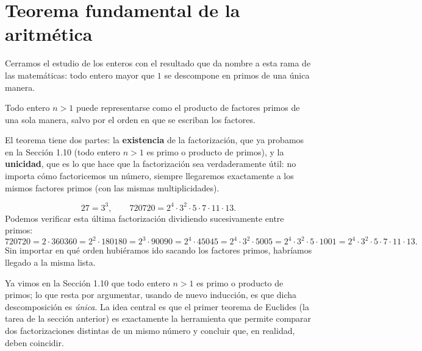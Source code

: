 \documentclass[12pt,a4paper]{book}
\begin{document}
  \section{Teorema fundamental de la aritmética}
  
  Cerramos el estudio de los enteros con el resultado que da nombre a esta rama de las matemáticas: todo entero mayor que $1$ se descompone en primos de una única manera.
  
  \begin{teorema}
    Todo entero $n>1$ puede representarse como el producto de factores primos de una sola manera, salvo por el orden en que se escriban los factores.
  \end{teorema}
  
  El teorema tiene dos partes: la \textbf{existencia} de la factorización, que ya probamos en la Sección 1.10 (todo entero $n>1$ es primo o producto de primos), y la \textbf{unicidad}, que es lo que hace que la factorización sea verdaderamente útil: no importa cómo factoricemos un número, siempre llegaremos exactamente a los mismos factores primos (con las mismas multiplicidades).
  
  \begin{ejemplo}
    \begin{equation*}
      27 = 3^3, \qquad 720720 = 2^4\cdot 3^2\cdot 5\cdot 7\cdot 11\cdot 13.
    \end{equation*}
    Podemos verificar esta última factorización dividiendo sucesivamente entre primos:
    \begin{equation*}
      720720 = 2\cdot 360360 = 2^2\cdot 180180 = 2^3\cdot 90090 = 2^4\cdot 45045 = 2^4\cdot 3^2\cdot 5005 = 2^4\cdot 3^2\cdot 5\cdot 1001 = 2^4\cdot 3^2\cdot 5\cdot 7\cdot 11\cdot 13.
    \end{equation*}
    Sin importar en qué orden hubiéramos ido sacando los factores primos, habríamos llegado a la misma lista.
  \end{ejemplo}
  
  Ya vimos en la Sección 1.10 que todo entero $n>1$ es primo o producto de primos; lo que resta por argumentar, usando de nuevo inducción, es que dicha descomposición es \emph{única}. La idea central es que el primer teorema de Euclides (la tarea de la sección anterior) es exactamente la herramienta que permite comparar dos factorizaciones distintas de un mismo número y concluir que, en realidad, deben coincidir.
  
\end{document}
